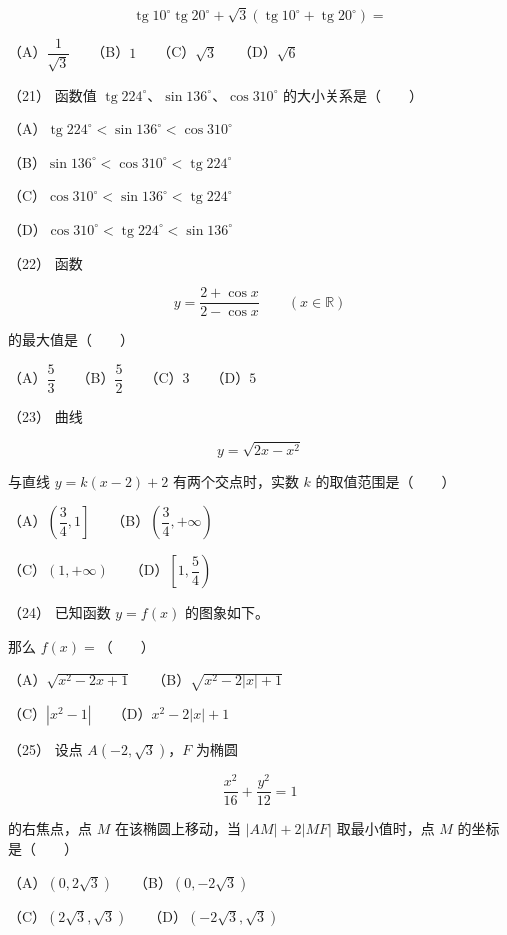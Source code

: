\begin{answer}
\nopagebreak[4]
\[
\operatorname{tg}10^\circ\operatorname{tg}20^\circ
+\sqrt3\left(\operatorname{tg}10^\circ+\operatorname{tg}20^\circ\right)=
\]

（A）$\dfrac1{\sqrt3}$　　（B）$1$　　（C）$\sqrt3$　　（D）$\sqrt6$

（21） 函数值 $\operatorname{tg}224^\circ\text{、}\sin136^\circ\text{、}\cos310^\circ$ 的大小关系是\mbox{（　　）}

（A）$\operatorname{tg}224^\circ<\sin136^\circ<\cos310^\circ$

（B）$\sin136^\circ<\cos310^\circ<\operatorname{tg}224^\circ$

（C）$\cos310^\circ<\sin136^\circ<\operatorname{tg}224^\circ$

（D）$\cos310^\circ<\operatorname{tg}224^\circ<\sin136^\circ$

（22） 函数

\nopagebreak[4]
\[
y=\frac{2+\cos x}{2-\cos x}\qquad(x\in\mathbb R)
\]

的最大值是\mbox{（　　）}

（A）$\dfrac53$　　（B）$\dfrac52$　　（C）$3$　　（D）$5$

（23） 曲线

\nopagebreak[4]
\[
y=\sqrt{2x-x^2}
\]

与直线 $y=k(x-2)+2$ 有两个交点时，实数 $k$ 的取值范围是\mbox{（　　）}

（A）$\left(\dfrac34,1\right]$　　（B）$\left(\dfrac34,+\infty\right)$

（C）$(1,+\infty)$　　（D）$\left[1,\dfrac54\right)$

（24） 已知函数 $y=f(x)$ 的图象如下。
\nopagebreak[4]
\begin{center}\end{center}
\nopagebreak[4]
那么 $f(x)=$\mbox{（　　）}

（A）$\sqrt{x^2-2x+1}$　　（B）$\sqrt{x^2-2|x|+1}$

（C）$|x^2-1|$　　（D）$x^2-2|x|+1$

（25） 设点 $A(-2,\sqrt3)$，$F$ 为椭圆

\nopagebreak[4]
\[
\frac{x^2}{16}+\frac{y^2}{12}=1
\]

的右焦点，点 $M$ 在该椭圆上移动，当 $|AM|+2|MF|$ 取最小值时，点 $M$ 的坐标是\mbox{（　　）}

（A）$(0,2\sqrt3)$　　（B）$(0,-2\sqrt3)$

（C）$(2\sqrt3,\sqrt3)$　　（D）$(-2\sqrt3,\sqrt3)$


\end{answer}
